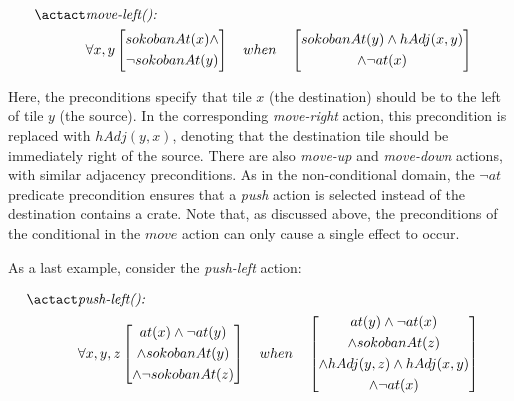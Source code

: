 \documentclass[../Master.tex]{subfiles}
\begin{document}
\begin{align*}
\actact & \textit{move-left(): } &  \\
& \forall x, y
    \left[
        \begin{gathered}
            sokobanAt(x) \land 
            \\ \neg sokobanAt(y) 
        \end{gathered}
    \right]
    \quad when \quad
    \left[ 
        \begin{gathered}
            sokobanAt(y) \land hAdj(x,y) \\ 
            \land \neg at(x)
        \end{gathered}
    \right]
\end{align*}

Here, the preconditions specify that tile $x$ (the destination) should be to the left of tile $y$ (the source). In the corresponding \textit{move-right} action, this precondition is replaced with $hAdj(y,x)$, denoting that the destination tile should be immediately right of the source. There are also \textit{move-up} and \textit{move-down} actions, with similar adjacency preconditions. As in the non-conditional domain, the $\neg at$ predicate precondition ensures that a \textit{push} action is selected instead of the destination contains a crate. Note that, as discussed above, the preconditions of the conditional in the $move$ action can only cause a single effect to occur.

As a last example, consider the \textit{push-left} action:

\begin{align*}
    \actact & \textit{push-left(): } & \\
    & \forall x, y, z
    \left[ 
        \begin{gathered}
            at(x) \land \neg at (y) \\
            \land sokobanAt(y) \\
            \land \neg sokobanAt(z) 
        \end{gathered}
    \right]
    \quad when \quad
    \left[
        \begin{gathered}
            at(y) \land \neg at(x) \\
            \land sokobanAt(z) \\ 
            \land hAdj (y,z) \land hAdj (x,y) \\
            \land \neg at(x)
        \end{gathered}
    \right]
\end{align*}
\end{document}
